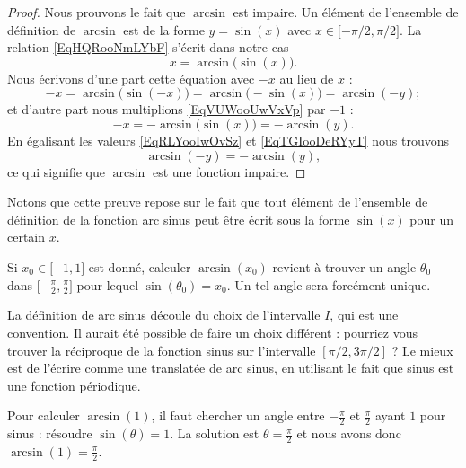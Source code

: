 \begin{proof}
    Nous prouvons le fait que \( \arcsin\) est impaire. Un élément de l'ensemble de définition de \( \arcsin\) est de la forme \( y=\sin(x)\) avec \( x\in\mathopen[ -\pi/2 , \pi/2 \mathclose]\). La relation \eqref{EqHQRooNmLYbF} s'écrit dans notre cas
    \begin{equation}    \label{EqVUWooUwVxVp}
        x=\arcsin\big( \sin(x) \big).
    \end{equation}
    Nous écrivons d'une part cette équation avec \( -x\) au lieu de \( x\) :
    \begin{equation}    \label{EqRLYooIwOvSz}
        -x=\arcsin\big( \sin(-x) \big)=\arcsin\big( -\sin(x) \big)=\arcsin(-y);
    \end{equation}
    et d'autre part nous multiplions \eqref{EqVUWooUwVxVp} par \( -1\) :
    \begin{equation}    \label{EqTGIooDeRYyT}
        -x=-\arcsin\big( \sin(x) \big)=-\arcsin(y).
    \end{equation}
    En égalisant les valeurs \eqref{EqRLYooIwOvSz} et \eqref{EqTGIooDeRYyT} nous trouvons
    \begin{equation}
        \arcsin(-y)=-\arcsin(y),
    \end{equation}
    ce qui signifie que \( \arcsin\) est une fonction impaire.
\end{proof}
Notons que cette preuve repose sur le fait que tout élément de l'ensemble de définition de la fonction arc sinus peut être écrit sous la forme \( \sin(x)\) pour un certain \( x\).

Si \( x_0\in\mathopen[ -1 , 1 \mathclose]\) est donné, calculer \( \arcsin(x_0)\) revient à trouver un angle \( \theta_0\) dans \( \mathopen[ -\frac{ \pi }{2} , \frac{ \pi }{2} \mathclose]\) pour lequel \( \sin(\theta_0)=x_0\). Un tel angle sera forcément unique.

\begin{remark}
  La définition de arc sinus découle du choix de l'intervalle $I$, qui est une convention. Il aurait été possible de faire un choix différent : pourriez vous trouver la réciproque de la fonction sinus sur l'intervalle $[\pi/2, 3\pi/2]$ ? Le mieux est de l'écrire comme une translatée de arc sinus, en utilisant le fait que sinus est une fonction périodique. 
\end{remark}

\begin{example}
    Pour calculer \( \arcsin(1)\), il faut chercher un angle entre \( -\frac{ \pi }{2}\) et \( \frac{ \pi }{ 2 }\) ayant \( 1\) pour sinus : résoudre \( \sin(\theta)=1\). La solution est \( \theta=\frac{ \pi }{2}\) et nous avons donc \( \arcsin(1)=\frac{ \pi }{2}\).
\end{example}


